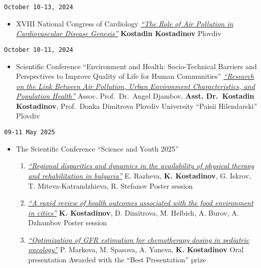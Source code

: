\documentclass[
  12pt,
  letterpaper,
  DIV=11,
  numbers=noendperiod]{scrartcl}
\providecommand{\tightlist}{%
  \setlength{\itemsep}{0pt}\setlength{\parskip}{0pt}}\usepackage{longtable,booktabs,array}
\begin{document}
\texttt{October\ 10-13,\ 2024}

\begin{itemize}
\tightlist
\item
  XVIII National Congress of Cardiology \textbar{}
  \emph{\href{https://www.bgcardio.org/storage/app/media/uploaded-files/XVIII\%20Congress\%20program_web.pdf}{``The
  Role of Air Pollution in Cardiovascular Disease Genesis''}} \textbar{}
  \textbf{Kostadin Kostadinov} \textbar{} Plovdiv
\end{itemize}

\texttt{October\ 10-11,\ 2024}

\begin{itemize}
\tightlist
\item
  Scientific Conference ``Environment and Health: Socio-Technical
  Barriers and Perspectives to Improve Quality of Life for Human
  Communities'' \textbar{}
  \emph{\href{https://hiddeneurope-jeanmonnet.uni-plovdiv.net/2024/10/\%d0\%bf\%d1\%80\%d0\%be\%d0\%b3\%d1\%80\%d0\%b0\%d0\%bc\%d0\%b0-\%d0\%bd\%d0\%b0-\%d0\%bd\%d0\%b0\%d1\%83\%d1\%87\%d0\%bd\%d0\%b0\%d1\%82\%d0\%b0-\%d0\%ba\%d0\%be\%d0\%bd\%d1\%84\%d0\%b5\%d1\%80\%d0\%b5\%d0\%bd\%d1\%86\%d0\%b8\%d1\%8f-\%d0\%be\%d0\%ba/}{``Research
  on the Link Between Air Pollution, Urban Environment Characteristics,
  and Population Health''}} \textbar{} Assoc. Prof.~Dr.~Angel Djambov,
  \textbf{Asst. Dr.~Kostadin Kostadinov}, Prof.~Donka Dimitrova
  \textbar{} Plovdiv University ``Paisii Hilendarski'' \textbar{}
  Plovdiv
\end{itemize}

\texttt{09-11\ May\ 2025}

\begin{itemize}
\tightlist
\item
  The Scientific Conference ``Science and Youth 2025''

  \begin{enumerate}
  \def\labelenumi{\arabic{enumi}.}
  \tightlist
  \item
    \emph{\href{https://asclepius.bg/cnm/wp-content/uploads/2025/05/SY-DMS-2025-abstracts.pdf}{``Regional
    disparities and dynamics in the availability of physical therapy and
    rehabilitation in bulgaria''}} \textbar{} E. Razheva, \textbf{K.
    Kostadinov}, G. Iskrov, T. Miteva-Katrandzhieva, R. Stefanov
    \textbar{} Poster session
  \item
    \emph{\href{https://asclepius.bg/cnm/wp-content/uploads/2025/05/SY-DMS-2025-abstracts.pdf}{``A
    rapid review of health outcomes associated with the food environment
    in cities''}} \textbar{} \textbf{K. Kostadinov}, D. Dimitrova, M.
    Helbich, A. Burov, A. Dzhambov \textbar{} Poster session
  \item
    \emph{\href{https://asclepius.bg/cnm/wp-content/uploads/2025/05/SY-DMS-2025-abstracts.pdf}{``Optimization
    of GFR estimation for chemotherapy dosing in pediatric oncology''}}
    \textbar{} P. Markova, M. Spasova, A. Yaneva, \textbf{K. Kostadinov}
    \textbar{} Oral presentation \textbar{} Awarded with the ``Best
    Presentation'' prize
  \end{enumerate}
\end{itemize}
\end{document}
